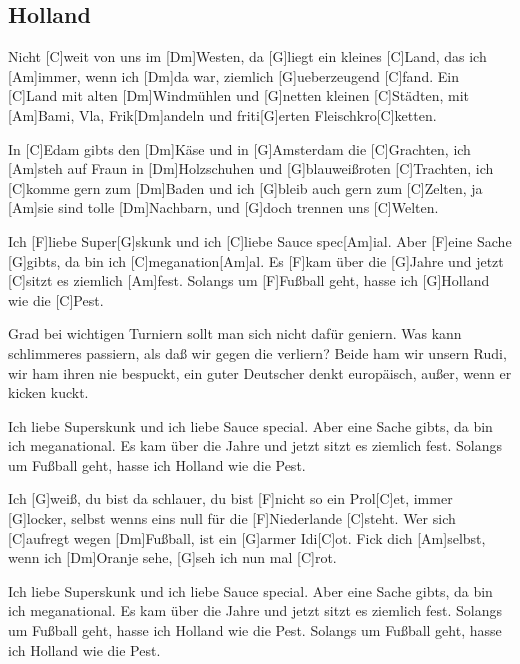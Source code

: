 \subsection*{Holland   }
\begin{guitar}

Nicht [C]weit von uns im [Dm]Westen, da [G]liegt ein kleines [C]Land,
das ich [Am]immer, wenn ich [Dm]da war, ziemlich [G]ueberzeugend [C]fand.
Ein [C]Land mit alten [Dm]Windmühlen und [G]netten kleinen [C]Städten,
mit [Am]Bami, Vla, Frik[Dm]andeln und friti[G]erten Fleischkro[C]ketten.

In [C]Edam gibts den [Dm]Käse und in [G]Amsterdam die [C]Grachten,
ich [Am]steh auf Fraun in [Dm]Holzschuhen und [G]blauweißroten [C]Trachten,
ich [C]komme gern zum [Dm]Baden und ich [G]bleib auch gern zum [C]Zelten,
ja [Am]sie sind tolle [Dm]Nachbarn, und [G]doch trennen uns [C]Welten.


Ich [F]liebe Super[G]skunk und ich [C]liebe Sauce spec[Am]ial.
Aber [F]eine Sache [G]gibts, da bin ich [C]meganation[Am]al.
Es [F]kam über die [G]Jahre und jetzt [C]sitzt es ziemlich [Am]fest.
Solangs um [F]Fußball geht, hasse ich [G]Holland wie die [C]Pest.


Grad bei wichtigen Turniern sollt man sich nicht dafür geniern.
Was kann schlimmeres passiern, als daß wir gegen die verliern?
Beide ham wir unsern Rudi, wir ham ihren nie bespuckt,
ein guter Deutscher denkt europäisch, außer, wenn er kicken kuckt.


Ich liebe Superskunk und ich liebe Sauce special.
Aber eine Sache gibts, da bin ich meganational.
Es kam über die Jahre und jetzt sitzt es ziemlich fest.
Solangs um Fußball geht, hasse ich Holland wie die Pest.


Ich [G]weiß, du bist da schlauer, du bist [F]nicht so ein Prol[C]et,
immer [G]locker, selbst wenns eins null für die [F]Niederlande [C]steht.
Wer sich [C]aufregt wegen [Dm]Fußball, ist ein [G]armer Idi[C]ot.
Fick dich [Am]selbst, wenn ich [Dm]Oranje sehe, [G]seh ich nun mal [C]rot.


Ich liebe Superskunk und ich liebe Sauce special.
Aber eine Sache gibts, da bin ich meganational.
Es kam über die Jahre und jetzt sitzt es ziemlich fest.
Solangs um Fußball geht, hasse ich Holland wie die Pest.
Solangs um Fußball geht, hasse ich Holland wie die Pest.
\end{guitar}

